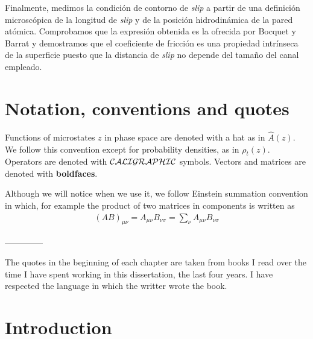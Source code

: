 \documentclass[b5paper,openright,10pt]{book}
\begin{document}
Finalmente, medimos la condición de contorno de \textit{slip} a partir de una definición microscópica de la longitud de \textit{slip} y de la posición hidrodinámica de la pared atómica. Comprobamos que la expresión obtenida es la ofrecida por Bocquet y Barrat \cite{Bocquet1994} y demostramos que el coeficiente de fricción es una propiedad intrínseca de la superficie puesto que la distancia de \textit{slip} no depende del tamaño del canal empleado. 


\chapter*{Notation, conventions and quotes}

Functions of microstates $z$ in phase space are denoted with a hat as in $\hat{A}(z)$. We follow this convention except for probability densities, as in $\rho_t(z)$. Operators are denoted with ${\cal CALIGRAPHIC}$ symbols. Vectors and matrices are denoted with {\bf boldfaces}.

Although we will notice when we use it, we follow Einstein summation convention in which, for example the product of two matrices in components is written as
\begin{align}
    (AB)_{\mu\nu} = A_{\mu\nu}B_{\nu\sigma}=\sum_{\nu}A_{\mu\nu}B_{\nu\sigma} \nonumber
\end{align}

--------------

The quotes in the beginning of each chapter are taken from books I read over the time I have spent working in this dissertation, the last four years. I have respected the language in which the writter wrote the book. 

\setcounter{chapter}{-1}
\chapter{Introduction}
\label{Introduction}
\pagestyle{chapters}  %
\end{document}
